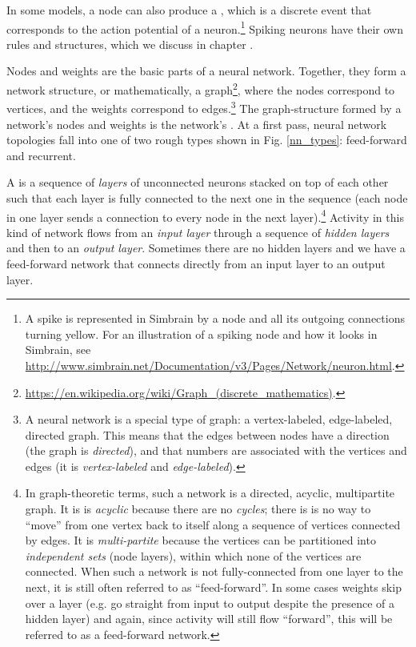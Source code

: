 In some models, a node can also produce a , which is a discrete event that corresponds to the action potential of a neuron.\footnote{A spike is represented in Simbrain by a node and all its outgoing connections turning yellow. For an illustration of a spiking node and how it looks in Simbrain, see \url{http://www.simbrain.net/Documentation/v3/Pages/Network/neuron.html}.}  Spiking neurons have their own rules and structures, which we discuss in chapter .

Nodes and weights are the basic parts of a neural network. Together, they form a network structure, or mathematically, a graph\footnote{\url{https://en.wikipedia.org/wiki/Graph_(discrete_mathematics)}.}, where the nodes correspond to vertices, and the weights correspond to edges.\footnote{A neural network is a special type of graph: a vertex-labeled, edge-labeled, directed graph. This means that the edges between nodes have a direction (the graph is \emph{directed}), and that numbers are associated with the vertices and edges (it is \emph{vertex-labeled} and \emph{edge-labeled}).}  The graph-structure formed by a network's nodes and weights is the network's . At a first pass, neural network topologies fall into one of two rough types shown in Fig. \ref{nn_types}: feed-forward and recurrent. 

A   is a sequence of \emph{layers} of unconnected neurons stacked on top of each other such that each layer is fully connected to the next one in the sequence (each node in one layer sends a connection to every node in the next layer).\footnote{\label{acyclic} In graph-theoretic terms, such a network is a directed, acyclic, multipartite graph. It is is \emph{acyclic} because there are no \emph{cycles}; there is is no way to ``move'' from one vertex back to itself along a sequence of vertices connected by edges. It is \emph{multi-partite} because the vertices can be partitioned into \emph{independent sets} (node layers), within which none of the vertices are connected. When such a network is not fully-connected from one layer to the next, it is still often referred to as ``feed-forward''. In some cases weights skip over a layer (e.g. go straight from input to output despite the presence of a hidden layer) and again, since activity will still flow ``forward'', this will be referred to as a feed-forward network.}  Activity in this kind of network flows from an \emph{input layer} through a sequence of \emph{hidden layers} and then to an \emph{output layer}. Sometimes there are no hidden layers and we have a feed-forward network that connects directly from an input layer to an output layer.

